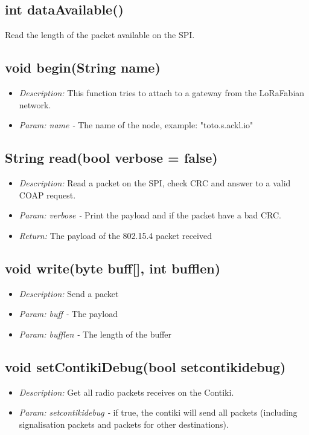 \documentclass{article}
\begin{document}
\subsection{int dataAvailable()}
Read the length of the packet available on the SPI.
\subsection{void begin(String name)}
\begin{itemize}
  \item \emph{Description:} This function tries to attach to a gateway from the LoRaFabian network.
  \item \emph{Param: name -} The name of the node, example: "toto.s.ackl.io"
\end{itemize}
\subsection{String read(bool verbose = false)}
\begin{itemize}
  \item \emph{Description:} Read a packet on the SPI, check CRC and answer to a valid COAP request.
  \item \emph{Param: verbose -} Print the payload and if the packet have a bad CRC.
  \item \emph{Return:} The payload of the 802.15.4 packet received
\end{itemize}
\subsection{void write(byte buff[], int bufflen)}
\begin{itemize}
  \item \emph{Description:} Send a packet
  \item \emph{Param: buff -} The payload
  \item \emph{Param: bufflen -} The length of the buffer
\end{itemize}
\subsection{void setContikiDebug(bool setcontikidebug)}
\begin{itemize}
  \item \emph{Description:} Get all radio packets receives on the Contiki.
  \item \emph{Param: setcontikidebug -} if true, the contiki will send all packets (including signalisation packets and packets for other destinations).
\end{itemize}
\end{document}

